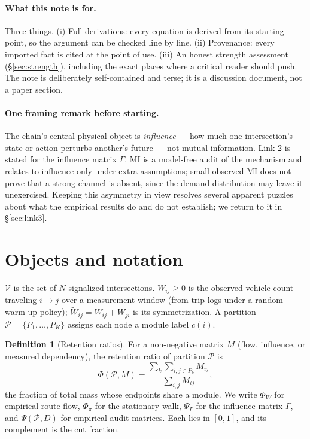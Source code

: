 \documentclass[11pt]{article}
\theoremstyle{definition}
\newtheorem{definition}[theorem]{Definition}
\theoremstyle{remark}
\newcommand{\Wt}{\widetilde{W}}
\newcommand{\PsiG}{\Psi_{\Gamma}}
\begin{document}
\paragraph{What this note is for.}
Three things.
(i) Full derivations: every equation is derived from its starting point, so
the argument can be checked line by line.
(ii) Provenance: every imported fact is cited at the point of use.
(iii) An honest strength assessment (\S\ref{sec:strength}), including the
exact places where a critical reader should push.
The note is deliberately self-contained and terse; it is a discussion
document, not a paper section.

\paragraph{One framing remark before starting.}
The chain's central physical object is \emph{influence} --- how much one
intersection's state or action perturbs another's future --- not mutual
information.
Link 2 is stated for the influence matrix $\Gamma$.
MI is a model-free audit of the mechanism and relates to influence only under
extra assumptions; small observed MI does not prove that a strong channel is
absent, since the demand distribution may leave it unexercised.
Keeping this asymmetry in view resolves several apparent puzzles about what
the empirical results do and do not establish; we return to it in
\S\ref{sec:link3}.

\section{Objects and notation}
\label{sec:notation}

$\mathcal{V}$ is the set of $N$ signalized intersections.
$W_{ij} \geq 0$ is the observed vehicle count traveling $i \to j$ over a
measurement window (from trip logs under a random warm-up policy);
$\Wt_{ij} = W_{ij} + W_{ji}$ is its symmetrization.
A partition $\mathcal{P} = \{P_1, \dots, P_K\}$ assigns each node a module
label $c(i)$.

\begin{definition}[Retention ratios]
    For a non-negative matrix $M$ (flow, influence, or measured dependency),
    the retention ratio of
    partition $\mathcal{P}$ is
    \begin{equation}
        \Phi(\mathcal{P}, M)
        = \frac{\sum_{k} \sum_{i,j \in P_k} M_{ij}}{\sum_{i,j} M_{ij}},
        \label{eq:retention}
    \end{equation}
    the fraction of total mass whose endpoints share a module.
    We write $\Phi_W$ for empirical route flow, $\Phi_\pi$ for the stationary
    walk, $\PsiG$ for the influence matrix $\Gamma$, and
    $\Psi(\mathcal{P},D)$ for empirical audit matrices.
    Each lies in $[0,1]$, and its complement is the cut fraction.
\end{definition}
\end{document}
